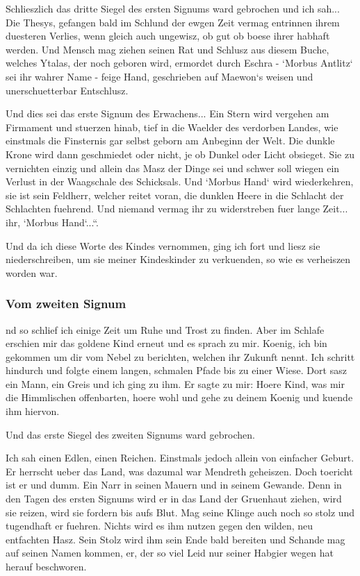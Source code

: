 \documentclass[a5paper,8pt]{book}
\begin{document}
Schlieszlich das dritte Siegel des ersten Signums ward gebrochen und ich sah...
Die Thesys, gefangen bald im Schlund der ewgen Zeit vermag entrinnen ihrem duesteren Verlies, wenn gleich auch ungewisz, ob gut ob boese ihrer habhaft werden. Und Mensch mag ziehen seinen Rat und Schlusz aus diesem Buche, welches Ytalas, der noch geboren wird, ermordet durch Eschra - ‘Morbus Antlitz‘ sei ihr wahrer Name - feige Hand, geschrieben auf Maewon‘s weisen und unerschuetterbar Entschlusz.

Und dies sei das erste Signum des Erwachens...
Ein Stern wird vergehen am Firmament und stuerzen hinab, tief in die Waelder des verdorben Landes, wie einstmals die Finsternis gar selbst geborn am Anbeginn der Welt. Die dunkle Krone wird dann geschmiedet oder nicht, je ob Dunkel oder Licht obsieget. Sie zu vernichten einzig und allein das Masz der Dinge sei und schwer soll wiegen ein Verlust in der Waagschale des Schicksals. Und ‘Morbus Hand‘ wird wiederkehren, sie ist sein Feldherr, welcher reitet voran, die dunklen Heere in die Schlacht der Schlachten fuehrend. Und niemand vermag ihr zu widerstreben fuer lange Zeit... ihr, ‘Morbus Hand‘...“.

Und da ich diese Worte des Kindes vernommen, ging ich fort und liesz sie niederschreiben, um sie meiner Kindeskinder zu verkuenden, so wie es verheiszen worden war. 

\newpage

\subsubsection{ Vom zweiten Signum}

nd so schlief ich einige Zeit um Ruhe und Trost zu finden. Aber im Schlafe erschien mir das goldene Kind erneut und es sprach zu mir. Koenig, ich bin gekommen um dir vom Nebel zu berichten, welchen ihr Zukunft nennt. Ich schritt hindurch und folgte einem langen, schmalen Pfade bis zu einer Wiese. Dort sasz ein Mann, ein Greis und ich ging zu ihm. Er sagte zu mir: Hoere Kind, was mir die Himmlischen offenbarten, hoere wohl und gehe zu deinem Koenig und kuende ihm hiervon.

Und das erste Siegel des zweiten Signums ward gebrochen.

Ich sah einen Edlen, einen Reichen. Einstmals jedoch allein von einfacher Geburt. Er herrscht ueber das Land, was dazumal war Mendreth geheiszen. Doch toericht ist er und dumm. Ein Narr in seinen Mauern und in seinem Gewande. Denn in den Tagen des ersten Signums wird er in das Land der Gruenhaut ziehen, wird sie reizen, wird sie fordern bis aufs Blut. Mag seine Klinge auch noch so stolz und tugendhaft er fuehren. Nichts wird es ihm nutzen gegen den wilden, neu entfachten Hasz. Sein Stolz wird ihm sein Ende bald bereiten und Schande mag auf seinen Namen kommen, er, der so viel Leid nur seiner Habgier wegen hat herauf beschworen.
\end{document}
